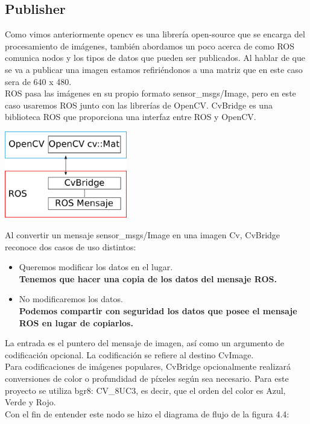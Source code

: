 \subsection{Publisher}
Como vimos anteriormente opencv es una librería open-source que se encarga del procesamiento
de imágenes, también abordamos un poco acerca de como ROS comunica nodos y los
tipos de datos que pueden ser publicados. Al hablar de que se va a publicar una imagen
estamos refiriéndonos a una matriz que en este caso sera de 640 x 480.\\
ROS pasa las imágenes en su propio formato sensor\_msgs/Image, pero
en este caso usaremos ROS junto con las librerías de OpenCV. CvBridge es una
biblioteca ROS que proporciona una interfaz entre ROS y OpenCV.
\begin{center}
	\includegraphics[width=0.4\textwidth]{Contenido/Cuerpo/Capitulo4/Fig1.eps}
	\label{Fig1}
\end{center}
Al convertir un mensaje sensor\_msgs/Image en una imagen Cv, CvBridge
reconoce dos casos de uso distintos:
\begin{itemize}
	\item Queremos modificar los datos en el lugar.\\
	      \textbf{Tenemos que hacer una copia de los datos del mensaje ROS.}
	\item No modificaremos los datos.\\
	      \textbf{Podemos compartir con seguridad los datos que posee el mensaje ROS en lugar de copiarlos.}
\end{itemize}
La entrada es el puntero del mensaje de imagen, así como un argumento de
codificación opcional. La codificación se refiere al destino CvImage.\\
Para codificaciones de imágenes populares, CvBridge opcionalmente realizará
conversiones de color o profundidad de píxeles según sea necesario. Para este proyecto
se utiliza bgr8: CV\_8UC3, es decir, que el orden del color es Azul, Verde y Rojo.\\
Con el fin de entender este nodo se hizo el diagrama de flujo de la figura 4.4:
